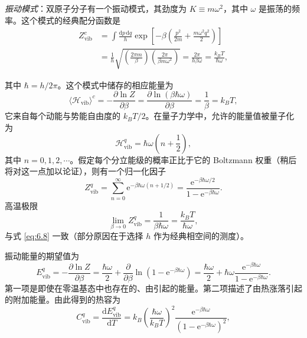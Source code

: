 \emph{振动模式}：双原子分子有一个振动模式，其劲度为 $K\equiv m\omega^2$，其中 $\omega$ 是振荡的频率。这个模式的经典配分函数是
\begin{equation}\label{eq:6.8}
\begin{aligned}
Z_{\text{vib}}^c&=\int\frac{\mathrm dp\,\mathrm dq}{h}\exp\left[-\beta\left(\frac{p^2}{2m}+\frac{m\omega^2q^2}{2}\right)\right]\\
&=\frac1h\sqrt{\left(\frac{2\pi m}{\beta}\right)\left(\frac{2\pi}{\beta m\omega^2}\right)}=\frac{2\pi}{h\beta\omega}=\frac{k_BT}{\hbar\omega},
\end{aligned}
\end{equation}


其中 $\hbar=h/2\pi$。这个模式中储存的相应能量为
\begin{equation}\label{eq:6.9}
\langle\mathscr H_{\text{vib}}\rangle^c=-\frac{\partial\ln Z}{\partial\beta}=\frac{\partial\ln(\beta\hbar\omega)}{\partial\beta}=\frac1\beta=k_BT,
\end{equation}
它来自每个动能与势能自由度的 $k_BT/2$。在量子力学中，允许的能量值被量子化为
\begin{equation}\label{eq:6.10}
\mathscr H^q_{\text{vib}}=\hbar\omega\left(n+\frac12\right),
\end{equation}
其中 $n=0,1,2,\cdots$。假定每个分立能级的概率正比于它的 Boltzmann 权重（稍后将对这一点加以论证），则有一个归一化因子
\begin{equation}\label{eq:6.11}
Z^q_{\text{vib}}=\sum_{n=0}^{\infty}\mathrm e^{-\beta\hbar\omega(n+1/2)}=\frac{\mathrm e^{-\beta\hbar\omega/2}}{1-\mathrm e^{-\beta\hbar\omega}}.
\end{equation}
高温极限
\begin{equation*}
\lim_{\beta\to0}Z^q_{\text{vib}}=\frac1{\beta\hbar\omega}=\frac{k_BT}{\hbar\omega},
\end{equation*}
与式 \eqref{eq:6.8} 一致（部分原因在于选择 $h$ 作为经典相空间的测度）。

振动能量的期望值为
\begin{equation}\label{eq:6.12}
E^q_{\text{vib}}=-\frac{\partial\ln Z}{\partial\beta}=\frac{\hbar\omega}{2}+\frac{\partial}{\partial\beta}\ln\left(1-\mathrm e^{-\beta\hbar\omega}\right)=\frac{\hbar\omega}{2}+\hbar\omega\frac{\mathrm e^{-\beta\hbar\omega}}{1-\mathrm e^{-\beta\hbar\omega}}.
\end{equation}
第一项是即使在零温基态中也存在的、由引起的能量。第二项描述了由热涨落引起的附加能量。由此得到的热容为
\begin{equation}\label{eq:6.13}
C^q_{\text{vib}}=\frac{\mathrm dE^q_{\text{vib}}}{\mathrm dT}=k_B\left(\frac{\hbar\omega}{k_BT}\right)^2\frac{\mathrm e^{-\beta\hbar\omega}}{\left(1-\mathrm e^{-\beta\hbar\omega}\right)^2},
\end{equation}

